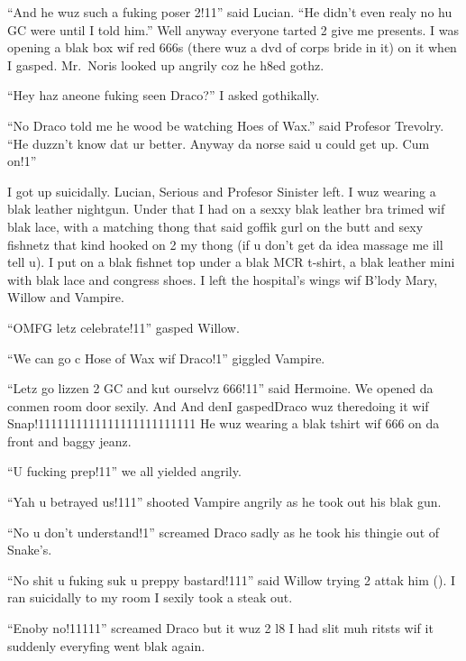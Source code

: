 \enquote{And he wuz such a fuking poser 2!11} said Lucian. \enquote{He didn't even realy no hu GC were until I told him.} Well anyway everyone tarted 2 give me presents. I was opening a blak box wif red 666s (there wuz a dvd of corps bride in it) on it when I gasped. Mr.~Noris looked up angrily coz he h8ed gothz.

\enquote{Hey haz aneone fuking seen Draco?} I asked gothikally.

\enquote{No Draco told me he wood be watching Hoes of Wax.} said Profesor Trevolry. \enquote{He duzzn't know dat ur better. Anyway da norse said u could get up. Cum on!1}

I got up suicidally. Lucian, Serious and Profesor Sinister left. I wuz wearing a blak leather nightgun. Under that I had on a sexxy blak leather bra trimed wif blak lace, with a matching thong that said goffik gurl on the butt and sexy fishnetz that kind hooked on 2 my thong (if u don't get da idea massage me ill tell u). I put on a blak fishnet top under a blak MCR t-shirt, a blak leather mini with blak lace and congress shoes. I left the hospital's wings wif B'lody Mary, Willow and Vampire.

\enquote{OMFG letz celebrate!11} gasped Willow.

\enquote{We can go c Hose of Wax wif Draco!1} giggled Vampire.

\enquote{Letz go lizzen 2 GC and kut ourselvz 666!11} said Hermoine. We opened da conmen room door sexily. And And den\dotfill\newline I gasped\dotfill Draco wuz there\newline doing it wif Snap!1111111111111111111111111 He wuz wearing a blak tshirt wif 666 on da front and baggy jeanz.

\enquote{U fucking prep!11} we all yielded angrily.

\enquote{Yah u betrayed us!111} shooted Vampire angrily as he took out his blak gun.

\enquote{No u don't understand!1} screamed Draco sadly as he took his thingie out of Snake's.

\enquote{No shit u fuking suk u preppy bastard!111} said Willow trying 2 attak him (). I ran suicidally to my room I sexily took a steak out.

\enquote{Enoby no!11111} screamed Draco but it wuz 2 l8 I had slit muh ritsts wif it suddenly everyfing went blak again.

\begin{sloppypar}
\end{sloppypar}
